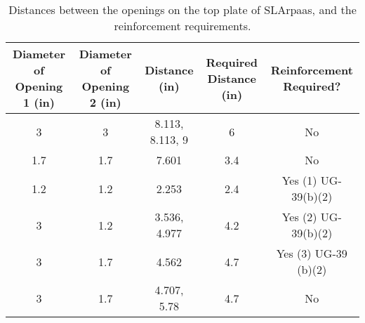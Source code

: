 \begin{table}[h]
\begin{center}
\tabcolsep=10pt
\begin{tabular}{c|c|c|c|c}
\hline
\hline
\multicolumn{1}{p{2cm}|}{Diameter of Opening 1 (in)} & 
\multicolumn{1}{p{2cm}|}{Diameter of Opening 2 (in)} & Distance (in) & 
\multicolumn{1}{p{2cm}|}{Required Distance (in)} & 
\multicolumn{1}{p{2.5cm}}{Reinforcement Required?} \\
\hline
3 & 3 & 8.113, 8.113, 9 & 6 & No \\
1.7 & 1.7 & 7.601 & 3.4 & No \\
1.2 & 1.2 & 2.253 & 2.4 & Yes (1) UG-39(b)(2) \\
3 & 1.2 & 3.536, 4.977 & 4.2 & Yes (2) UG-39(b)(2) \\
3 & 1.7 & 4.562 & 4.7 & Yes (3) UG-39 (b)(2) \\
3 & 1.7 & 4.707, 5.78 & 4.7 & No \\
\hline
\hline
\end{tabular}
\caption{Distances between the openings on the top plate of
SLArpaas, and the reinforcement requirements.}
\label{table:opening_dist}
\end{center}
\end{table}
